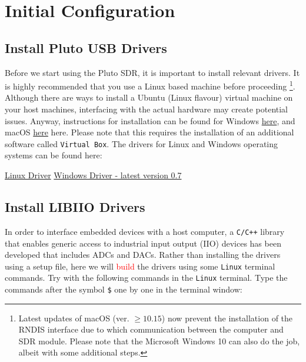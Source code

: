 \documentclass[11pt]{article}
\begin{document}
\section{Initial Configuration}


\subsection{Install Pluto USB Drivers}
Before we start using the Pluto SDR, it is important to install relevant drivers. It is highly recommended that you use a Linux based machine before proceeding \footnote[1]{Latest updates of macOS (ver. $\ge 10.15$) now prevent the installation of the RNDIS interface due to which communication between the computer and SDR module. Please note that the Microsoft Windows 10 can also do the job, albeit with some additional steps.}. Although there are ways to install a Ubuntu (Linux flavour) virtual machine on your host machines, interfacing with the actual hardware may create potential issues. Anyway, instructions for installation  can be found for Windows \href{https://www.wikihow.com/Install-Ubuntu-on-VirtualBox}{here}, and macOS \href{https://codingwithmanny.medium.com/installing-ubuntu-18-04-on-mac-os-with-virtualbox-ac3b39678602}{here} here. Please note that this requires the installation of an additional software called \texttt{Virtual Box}. The drivers for Linux and Windows operating systems can be found here:
\begin{outline}
  \1 \href{https://wiki.analog.com/_media/university/tools/pluto/drivers/plutosdr-m2k-udev_1.0_amd64.deb}{Linux Driver}
  \1 \href{https://wiki.analog.com/university/tools/pluto/drivers/windows}{Windows Driver - latest version 0.7}
\end{outline}

\subsection{Install LIBIIO Drivers}

In order to interface embedded devices with a host computer, a \texttt{C/C++} library that enables generic access to industrial input output (IIO) devices has been developed that includes ADCs and DACs. Rather than installing the drivers using a setup file, here we will \textcolor{red}{build} the drivers using some \texttt{Linux} terminal commands. Try with the following commands in the \texttt{Linux} terminal. Type the commands after the symbol \texttt{\$} one by one in the terminal window:
\end{document}
